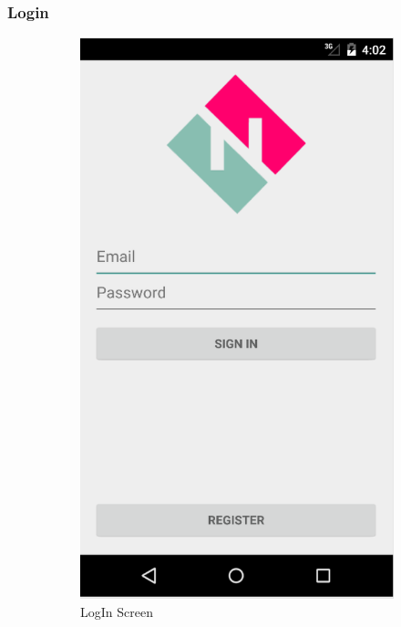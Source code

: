 \subsubsection{Login}
\begin{figure}[h]
 
\begin{subfigure}{0.5\textwidth}
\includegraphics[width=0.9\linewidth]{./Bilder/logIn.png} 
\caption{LogIn Screen}
\label{fig:login}
\end{subfigure}
\begin{subfigure}{0.5\textwidth}

\end{subfigure}
\end{figure}
